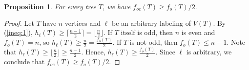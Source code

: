 \documentclass{article}
\newcommand{\2}{\vspace{0.2cm}}
\newtheorem{proposition}[theorem]{Proposition}
\begin{document}
\begin{proposition}\label{prop:tree}
For every tree $T$, we have $f_{oe}(T)\ge f_o(T)/2.$
\end{proposition}
\begin{proof}
Let $T$ have $n$ vertices and $\ell$ be an arbitrary labeling of $V(T)$.
By (\ref{ineq:1}),
$h_{\ell}(T) \ge \lceil{\frac{n-1}{2}}\rceil = \lfloor{\frac{n}{2}}\rfloor$.  If $T$ itself is odd, then $n$ is even and
$f_o(T)=n$, so
$h_{\ell}(T) \ge \frac{n}{2} = \frac{f_o(T)}{2}.$
If $T$ is not odd, then $f_o(T)\le n-1$. Note that $h_{\ell}(T) \ge \lfloor{\frac{n}{2}}\rfloor\ge \frac{n-1}{2}.$ 
Hence, $h_{\ell}(T) \ge \frac{f_o(T)}{2}.$
Since $\ell$ is arbitrary, we conclude that $f_{oe}(T)\ge f_o(T)/2$.
\end{proof}




\end{document}
